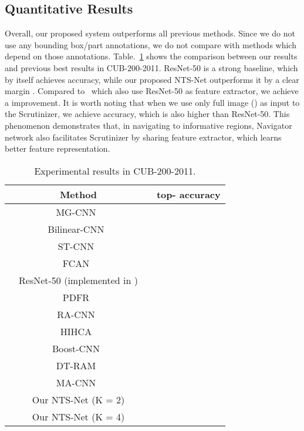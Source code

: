 \documentclass[runningheads]{llncs}
\begin{document}
\subsection{Quantitative Results}
Overall, our proposed system outperforms all previous methods. Since we do not use any bounding box/part annotations, we do not compare with methods which depend on those annotations. Table.~\ref{birds} shows the comparison between our results and previous best results in CUB-200-2011. ResNet-50 is a strong baseline, which by itself achieves  accuracy, while our proposed NTS-Net outperforms it by a clear margin . Compared to~\cite{Li_2017_ICCV_Workshops} which also use ResNet-50 as feature extractor, we achieve a  improvement. It is worth noting that when we use only full image () as input to the Scrutinizer, we achieve  accuracy, which is also higher than ResNet-50. This phenomenon demonstrates that, in navigating to informative regions, Navigator network also facilitates Scrutinizer by sharing feature extractor, which learns better feature representation.
\begin{table}[ht]
	\begin{center}
	\begin{tabular}{|c|c|}
	\hline
	Method & top- accuracy \\
	\hline\hline
	MG-CNN~\cite{Wang2015Multiple} &  \\
	\hline
	Bilinear-CNN~\cite{lin2015bilinear} &  \\
	\hline
	ST-CNN~\cite{NIPS2015_5854} &  \\
	\hline
	FCAN~\cite{FCAN} & \\
	\hline
	~~ResNet-50 (implemented in \cite{Li_2017_ICCV_Workshops})~~ &  \\
	\hline
	PDFR~\cite{Zhang_2016_CVPR} & \\
	\hline
	RA-CNN~\cite{Fu_2017_CVPR} & \\
	\hline
	HIHCA~\cite{Cai_2017_ICCV} & \\
	\hline
	Boost-CNN~\cite{Moghimi2016Boosted} & \\
	\hline
	DT-RAM~\cite{Li_2017_ICCV_Workshops} & \\
	\hline
	MA-CNN~\cite{Zheng_2017_ICCV} & \\
	\hline
	\hline
	Our NTS-Net (K = 2) & \\
	\hline
	Our NTS-Net (K = 4) & \\
	\hline
	\end{tabular}
	\end{center}
\caption{Experimental results in CUB-200-2011.}
\label{birds}
\end{table}
\end{document}
